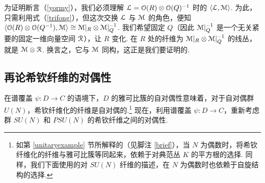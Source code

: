 为证明断言（\ref{yormy}），我们必须理解 ${\cal L}={\cal O}(R)\otimes {\cal O}(Q)^{-1}$ 时的 $\langle{\cal L},{\cal M}\rangle$. 为此，只需利用式（\ref{trifong}），但这次交换 ${\cal L}$ 与 ${\cal M}$ 的角色，便知 $\langle{\cal O}(R)\otimes {\cal O}(Q^{-1}),{\cal M}\rangle \cong {\cal M}|_R\otimes {\cal M}|_Q^{-1}$. 我们希望固定 $Q$（因此 ${\cal M}|_Q^{-1}$ 是一个无关紧要的固定一维向量空间 ${\cal R}$），让 $R$ 变化. 在 $R$ 处的纤维为 ${\cal M}|_R\otimes {\cal M}|_Q^{-1}$ 的线丛，就是 ${\cal M}\otimes {\cal R}$. 换言之，它与 ${\cal M}$ 同构，这正是我们要证明的.

\subsection{再论希钦纤维的对偶性}
\label{dualap}

在谱覆盖 $\psi:D\to C$ 的语境下，$D$ 的雅可比簇的自对偶性意味着，对于自对偶群 $U(N)$，希钦纤维化的纤维是自对偶的.\footnote{如第 \ref{unitaryexample} 节所解释的（见脚注 \ref{brief}），当 $N$ 为偶数时，将希钦纤维化的纤维与雅可比簇等同起来，依赖于对典范丛 $K$ 的平方根的选择. 同样，我们下面使用的对 $SU(N)$ 纤维的描述，在 $N$ 为偶数时也依赖于自旋结构的选择.} 现在，利用谱覆盖 $\psi:D\to C$，重新考虑群 $SU(N)$ 和 $PSU(N)$ 的希钦纤维之间的对偶性.

